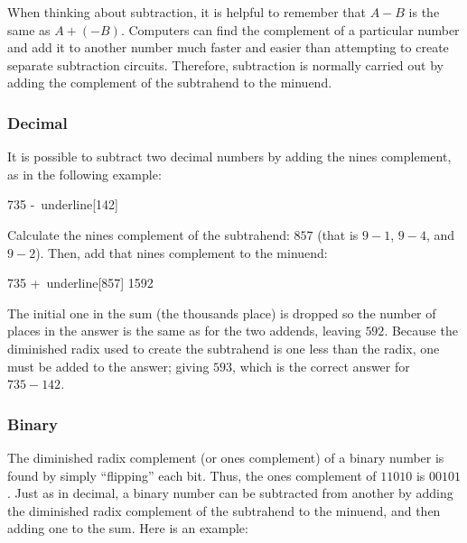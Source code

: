 When thinking about subtraction, it is helpful to remember that $ A - B $ is the same as $ A + (-B) $. Computers can find the complement of a particular number and add it to another number much faster and easier than attempting to create separate subtraction circuits. Therefore, subtraction is normally carried out by adding the complement of the subtrahend to the minuend.

\subsubsection{Decimal}
\label{MO:subsub:decimal_subtraction_with_diminished_radix}

 It is possible to subtract two decimal numbers by adding the nines complement, as in the following example:

\begin{binDisp}[commandchars=~\[\]]
      735
     -~underline[142]
\end{binDisp}

Calculate the nines complement of the subtrahend: $ 857 $ (that is $ 9-1 $, $ 9-4 $, and $ 9-2 $). Then, add that nines complement to the minuend: 

\begin{binDisp}[commandchars=~\[\]]
      735
     +~underline[857]
     1592
\end{binDisp}

The initial one in the sum (the thousands place) is dropped so the number of places in the answer is the same as for the two addends, leaving $ 592 $. Because the diminished radix used to create the subtrahend is one less than the radix, one must be added to the answer; giving $ 593 $, which is the correct answer for $ 735-142 $.

\subsubsection{Binary}
\label{MO:subsub:binary_subtraction_with_diminished_radix}

The diminished radix complement (or ones complement) of a binary number is found by simply ``flipping'' each bit. Thus, the ones complement of $ 11010 $ is $ 00101 $. Just as in decimal, a binary number can be subtracted from another by adding the diminished radix complement of the subtrahend to the minuend, and then adding one to the sum. Here is an example: 

